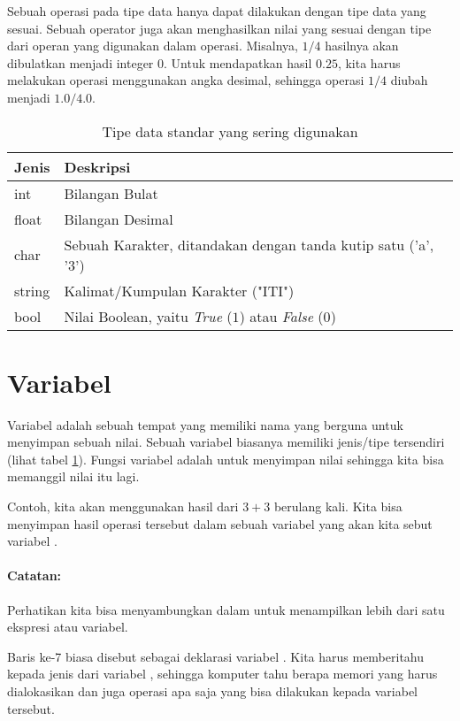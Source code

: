 \documentclass[../main.tex]{subfiles}
\begin{document}
Sebuah operasi pada tipe data hanya dapat dilakukan dengan tipe data yang sesuai.
Sebuah operator juga akan menghasilkan nilai yang sesuai dengan tipe dari operan
yang digunakan dalam operasi. Misalnya, \(1/4\) hasilnya akan dibulatkan menjadi
integer \(0\). Untuk mendapatkan hasil \(0.25\), kita harus melakukan operasi
menggunakan angka desimal, sehingga operasi \(1/4\) diubah menjadi \(1.0/4.0\).

\begin{table}
\centering
\begin{tabular}{@{} l l @{}}
  \toprule
  Jenis  & Deskripsi  \\
  \midrule
  int    & Bilangan Bulat\\
  float  & Bilangan Desimal\\
  char   & Sebuah Karakter, ditandakan dengan tanda kutip satu ('a', '3')\\
  string & Kalimat/Kumpulan Karakter ("ITI")\\
  bool   & Nilai Boolean, yaitu \emph{True} (\(1\)) atau \emph{False} (\(0\))\\
  \bottomrule
\end{tabular}
\caption{Tipe data standar yang sering digunakan}
\label{tipe-var}
\end{table}

\section{Variabel}
Variabel adalah sebuah tempat yang memiliki nama yang berguna untuk menyimpan
sebuah nilai. Sebuah variabel biasanya memiliki jenis\slash{}tipe tersendiri
(lihat tabel \ref{tipe-var}). Fungsi variabel adalah untuk menyimpan nilai
sehingga kita bisa memanggil nilai itu lagi.

Contoh, kita akan menggunakan hasil dari \(3+3\) berulang kali. Kita bisa
menyimpan hasil operasi tersebut dalam sebuah variabel yang akan kita sebut
variabel .


\paragraph{Catatan:}
Perhatikan kita bisa menyambungkan \code{<<} dalam  untuk menampilkan
lebih dari satu ekspresi atau variabel.

Baris ke-7 biasa disebut sebagai deklarasi variabel . Kita harus
memberitahu kepada  jenis dari variabel ,
sehingga komputer tahu berapa memori yang harus dialokasikan dan juga operasi
apa saja yang bisa dilakukan kepada variabel tersebut.
\end{document}
